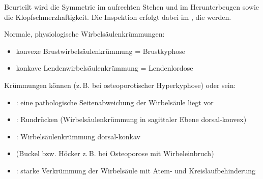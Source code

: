 {%
Beurteilt wird die Symmetrie im aufrechten Stehen und im
Herunterbeugen sowie die Klopfschmerzhaftigkeit. Die
Inspektion erfolgt dabei im , die  werden.
 
Normale, physiologische Wirbelsäulenkrümmungen:
\begin{itemize}
  \item konvexe Brustwirbelsäulenkrümmung = Brustkyphose
  \item konkave Lendenwirbelsäulenkrümmung = Lendenlordose
\end{itemize}

\noindent Krümmungen können  (z.\,B. bei
osteoporotischer Hyperkyphose) oder  sein:

\begin{itemize}
  \item {}: eine pathologische Seitenabweichung
  der Wirbelsäule liegt vor
  \item {}: Rundrücken
  (Wirbelsäulenkrümmung in sagittaler Ebene dorsal-konvex)
  \item {}: Wirbelsäulenkrümmung
  dorsal-konkav
  \item {} (Buckel bzw. Höcker z.\,B. bei
  Osteoporose mit Wirbeleinbruch)
  \item {}: starke Verkrümmung der
  Wirbelsäule mit Atem- und Kreislaufbehinderung
\end{itemize}}
{
\begin{PkuBefunde}[]
  \item[\SymbolPkuNormal] 
\end{PkuBefunde}
}
{}
{}
{}


